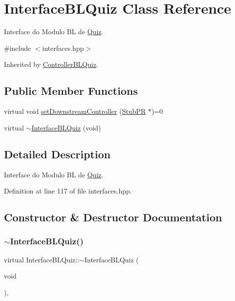 \hypertarget{class_interface_b_l_quiz}{}\section{Interface\+B\+L\+Quiz Class Reference}
\label{class_interface_b_l_quiz}


Interface do Modulo BL de \hyperlink{class_quiz}{Quiz}.  




{\ttfamily \#include $<$interfaces.\+hpp$>$}



Inherited by \hyperlink{class_controller_b_l_quiz}{Controller\+B\+L\+Quiz}.

\subsection*{Public Member Functions}
\begin{DoxyCompactItemize}
\item 
virtual void \hyperlink{class_interface_b_l_quiz_aa2af7b48e4caf5ecdf446f64a351c86f}{set\+Downstream\+Controller} (\hyperlink{class_stub_p_r}{Stub\+PR} $\ast$)=0
\item 
virtual \hyperlink{class_interface_b_l_quiz_ad0d695096bce05a96795024049c92eea}{$\sim$\+Interface\+B\+L\+Quiz} (void)
\end{DoxyCompactItemize}


\subsection{Detailed Description}
Interface do Modulo BL de \hyperlink{class_quiz}{Quiz}. 

Definition at line 117 of file interfaces.\+hpp.



\subsection{Constructor \& Destructor Documentation}
\mbox{\label{class_interface_b_l_quiz_ad0d695096bce05a96795024049c92eea}} 
\subsubsection{\texorpdfstring{$\sim$\+Interface\+B\+L\+Quiz()}{~InterfaceBLQuiz()}}
{\footnotesize\ttfamily virtual Interface\+B\+L\+Quiz\+::$\sim$\+Interface\+B\+L\+Quiz (\begin{DoxyParamCaption}\item[{void}]{ }\end{DoxyParamCaption})\hspace{0.3cm}{\ttfamily [inline]}, {\ttfamily [virtual]}}



